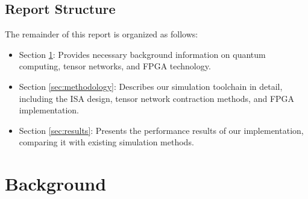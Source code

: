 \documentclass[12pt,oneside,a4paper]{article}
\begin{document}
\subsection{Report Structure}

The remainder of this report is organized as follows:

\begin{itemize}
    \item Section \ref{sec:background}: Provides necessary background information on quantum computing, tensor networks, and FPGA technology.
    \item Section \ref{sec:methodology}: Describes our simulation toolchain in detail, including the ISA design, tensor network contraction methods, and FPGA implementation.
    \item Section \ref{sec:results}: Presents the performance results of our implementation, comparing it with existing simulation methods.
\end{itemize}



\section{Background}
\label{sec:background}
\end{document}

